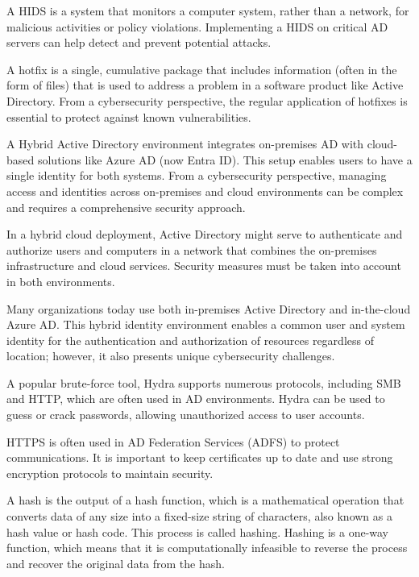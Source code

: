  A HIDS is a system that monitors a computer system, rather than a network, for malicious activities or policy violations. Implementing a HIDS on critical AD servers can help detect and prevent potential attacks.

 A hotfix is a single, cumulative package that includes information (often in the form of files) that is used to address a problem in a software product like Active Directory. From a cybersecurity perspective, the regular application of hotfixes is essential to protect against known vulnerabilities.

 A Hybrid Active Directory environment integrates on-premises AD with cloud-based solutions like Azure AD (now Entra ID). This setup enables users to have a single identity for both systems. From a cybersecurity perspective, managing access and identities across on-premises and cloud environments can be complex and requires a comprehensive security approach.

 In a hybrid cloud deployment, Active Directory might serve to authenticate and authorize users and computers in a network that combines the on-premises infrastructure and cloud services. Security measures must be taken into account in both environments.

 Many organizations today use both in-premises Active Directory and in-the-cloud Azure AD. This hybrid identity environment enables a common user and system identity for the authentication and authorization of resources regardless of location; however, it also presents unique cybersecurity challenges.

 A popular brute-force tool, Hydra supports numerous protocols, including SMB and HTTP, which are often used in AD environments. Hydra can be used to guess or crack passwords, allowing unauthorized access to user accounts.

 HTTPS is often used in AD Federation Services (ADFS) to protect communications. It is important to keep certificates up to date and use strong encryption protocols to maintain security.

 A hash is the output of a hash function, which is a mathematical operation that converts data of any size into a fixed-size string of characters, also known as a hash value or hash code. This process is called hashing. Hashing is a one-way function, which means that it is computationally infeasible to reverse the process and recover the original data from the hash.

